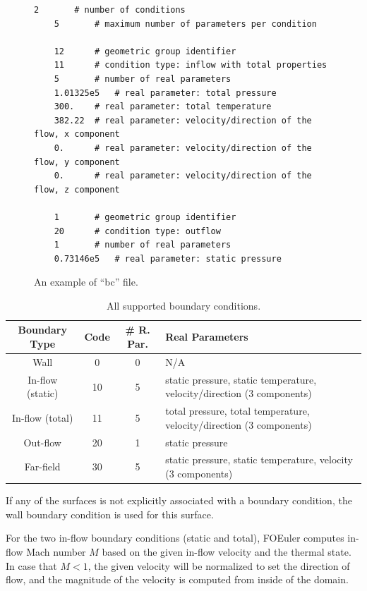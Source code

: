 \documentclass[]{article}
\begin{document}
\begin{figure}[h!]
  \begin{lstlisting}[backgroundcolor=\color{lightgray}]
    2		# number of conditions
    5		# maximum number of parameters per condition
    
    12		# geometric group identifier
    11		# condition type: inflow with total properties
    5		# number of real parameters
    1.01325e5	# real parameter: total pressure
    300.	# real parameter: total temperature
    382.22	# real parameter: velocity/direction of the flow, x component
    0.		# real parameter: velocity/direction of the flow, y component
    0.		# real parameter: velocity/direction of the flow, z component
    
    1		# geometric group identifier
    20		# condition type: outflow
    1		# number of real parameters
    0.73146e5	# real parameter: static pressure
  \end{lstlisting}
  \caption{An example of ``bc'' file.}
  \label{lst:bc}
\end{figure}

\begin{table}
\caption{All supported boundary conditions.}
  \begin{tabular}{cccl} 
    \hline
    Boundary Type & Code & \# R. Par. & Real Parameters \\ 
    \hline
    Wall & 0 & 0 & N/A \\ 
    In-flow (static) & 10 & 5 &
      static pressure, static temperature, velocity/direction (3 components) \\
    In-flow (total) & 11 & 5 &
      total pressure, total temperature, velocity/direction (3 components) \\
    Out-flow & 20 & 1 & static pressure  \\
    Far-field & 30 & 5 &
      static pressure, static temperature, velocity (3 components) \\
    \hline
  \end{tabular}
  \label{tab:bc}
\end{table}

If any of the surfaces is not explicitly associated with a boundary condition, the wall boundary
condition is used for this surface.

For the two in-flow boundary conditions (static and total), FOEuler computes in-flow Mach number $M$
based on the given in-flow velocity and the thermal state.
In case that $M<1$, the given velocity will be normalized to set the direction of flow, and the
magnitude of the velocity is computed from inside of the domain.
\end{document}
